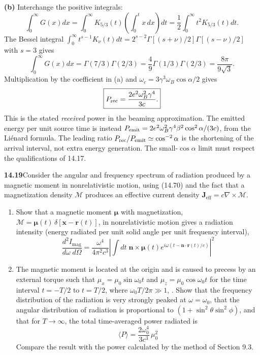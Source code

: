 \textbf{(b)} Interchange the positive integrals:
\[
\int_0^\infty G(x)dx
=\int_0^\infty K_{5/3}(t)\left(\int_0^t x\,dx\right)dt
=\frac12\int_0^\infty t^2K_{5/3}(t)dt.
\]
The Bessel integral
$\int_0^\infty t^{s-1}K_\nu(t)dt
=2^{s-2}\Gamma[(s+\nu)/2]\Gamma[(s-\nu)/2]$
with $s=3$ gives
\[
\int_0^\infty G(x)dx
=\Gamma(7/3)\Gamma(2/3)
=\frac49\Gamma(1/3)\Gamma(2/3)
=\frac{8\pi}{9\sqrt3}.
\]
Multiplication by the coefficient in (a) and
$\omega_c=3\gamma^3\omega_B\cos\alpha/2$ gives
\[
\boxed{P_{\rm rec}=\frac{2e^2\omega_B^2\gamma^4}{3c}.}
\]
This is the stated \emph{received} power in the beaming approximation.
The emitted energy per unit source time is instead
$P_{\rm emit}=2e^2\omega_B^2\gamma^4\beta^2\cos^2\alpha/(3c)$,
from the Li\'enard formula. The leading ratio
$P_{\rm rec}/P_{\rm emit}\simeq\cos^{-2}\alpha$ is the shortening of
the arrival interval, not extra energy generation. The small-$\cos\alpha$
limit must respect the qualifications of 14.17.

\par\bigskip
\noindent\textbf{14.19}\quad Consider the angular and frequency spectrum of radiation produced by a magnetic moment in nonrelativistic motion, using (14.70) and the fact that a magnetization density $\mathcal{M}$ produces an effective current density $\mathbf{J}_{\mathrm{eff}}=c\nabla\times\mathcal{M}$.
\begin{enumerate}
\item[(a)] Show that a magnetic moment $\boldsymbol{\mu}$ with magnetization, $\mathcal{M}=\boldsymbol{\mu}(t)\,\delta[\mathbf{x}-\mathbf{r}(t)]$, in nonrelativistic motion gives a radiation intensity (energy radiated per unit solid angle per unit frequency interval),
\[
\frac{d^{2}I_{\mathrm{mag}}}{d\omega\;d\Omega}=\frac{\omega^{4}}{4\pi^{2}c^{3}}\left|\int dt\;\mathbf{n}\times\boldsymbol{\mu}(t)e^{i\omega(t-\mathbf{n}\cdot\mathbf{r}(t)/c)}\right|^{2}
\]
\item[(b)] The magnetic moment is located at the origin and is caused to precess by an external torque such that $\mu_{x}=\mu_{0}\sin\omega_{0}t$ and $\mu_{z}=\mu_{0}\cos\omega_{0}t$ for the time interval $t=-T/2$ to $t=T/2$, where $\omega_{0}T/2\pi\gg1$, . Show that the frequency distribution of the radiation is very strongly peaked at $\omega=\omega_{0}$, that the angular distribution of radiation is proportional to $(1+\sin^{2}\theta\sin^{2}\phi)$, and that for $T\to\infty$, the total time-averaged power radiated is
\[
\langle P\rangle=\frac{2\omega_{0}^{4}}{3c^{3}}\,\mu_{0}^{2}
\]
Compare the result with the power calculated by the method of Section 9.3.
\end{enumerate}
\solution

